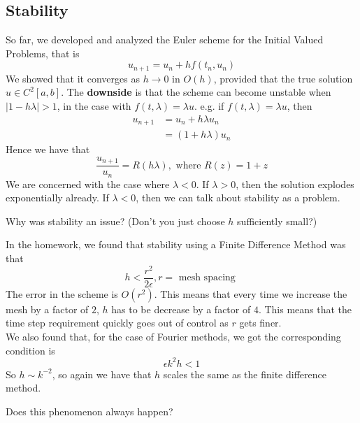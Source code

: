 \documentclass{article}
\begin{document}
\subsection{Stability}

So far, we developed and analyzed the Euler scheme for the Initial Valued Problems, that is
\[u_{n+1} = u_n + h f(t_n, u_n)\]
We showed that it converges as $h \to 0$ in $O(h)$, provided that the true solution $u \in C^2[a, b]$. The \textbf{downside} is that the scheme can become unstable when $|1 - h \lambda| > 1$, in the case with $f(t, \lambda) = \lambda u$. e.g. if $f(t, \lambda) = \lambda u$, then
\begin{align*}
    u_{n+1} &= u_n + h \lambda u_n\\
    &= (1 + h \lambda) u_n
\end{align*}
Hence we have that
\[\frac{u_{n+1}}{u_n} = R(h \lambda), \text{ where } R(z) = 1 + z\]
We are concerned with the case where $\lambda < 0$. If $\lambda > 0$, then the solution explodes exponentially already. If $\lambda < 0$, then we can talk about stability as a problem.
\begin{question}
    Why was stability an issue? (Don't you just choose $h$ sufficiently small?)
\end{question}

In the homework, we found that stability using a Finite Difference Method was that
\[h < \frac{r^2}{2\epsilon}, r = \text{ mesh spacing } \]
The error in the scheme is $O(r^2)$. This means that every time we increase the mesh by a factor of $2$, $h$ has to be decrease by a factor of $4$. This means that the time step requirement quickly goes out of control as $r$ gets finer.\\

We also found that, for the case of Fourier methods, we got the corresponding condition is 
\[\epsilon k^2 h < 1\]
So $h \sim k^{-2}$, so again we have that $h$ scales the same as the finite difference method.\\

\begin{question}
    Does this phenomenon always happen?
\end{question}
\end{document}
